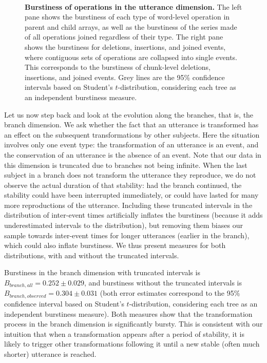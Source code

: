 \begin{figure}[!ht]
  \centering
  ~
  \caption[Burstiness of operations in the utterance dimension]{
  \textbf{Burstiness of operations in the utterance dimension.}
  The left pane shows the burstiness of each type of word-level operation in parent and child arrays, as well as the burstiness of the series made of all operations joined regardless of their type.
  The right pane shows the burstiness for deletions, insertions, and joined events, where contiguous sets of operations are collapsed into single events.
  This corresponds to the burstiness of chunk-level deletions, insertions, and joined events.
  Grey lines are the 95\% confidence intervals based on Student's $t$-distribution, considering each tree as an independent burstiness measure.
  }
  \label{fig:gistr-utterance-burstiness}
\end{figure}



Let us now step back and look at the evolution along the branches, that
is, the branch dimension. We ask whether the fact that an utterance is
transformed has an effect on the subsequent transformations by other
subjects. Here the situation involves only one event type: the
transformation of an utterance is an event, and the conservation of an
utterance is the absence of an event. Note that our data in this
dimension is truncated due to branches not being infinite. When the last
subject in a branch does not transform the utterance they reproduce, we
do not observe the actual duration of that stability: had the branch
continued, the stability could have been interrupted immediately, or
could have lasted for many more reproductions of the utterance.
Including these truncated intervals in the distribution of inter-event
times artificially inflates the burstiness (because it adds
underestimated intervals to the distribution), but removing them biases
our sample towards inter-event times for longer utterances (earlier in
the branch), which could also inflate burstiness. We thus present
measures for both distributions, with and without the truncated
intervals.

Burstiness in the branch dimension with truncated intervals is
\(B_{branch,all} = 0.252 \pm 0.029\), and burstiness without the
truncated intervals is \(B_{branch,observed} = 0.304 \pm 0.031\) (both
error estimates correspond to the 95\% confidence interval based on
Student's \(t\)-distribution, considering each tree as an independent
burstiness measure). Both measures show that the transformation process
in the branch dimension is significantly bursty. This is consistent with
our intuition that when a transformation appears after a period of
stability, it is likely to trigger other transformations following it
until a new stable (often much shorter) utterance is reached.

